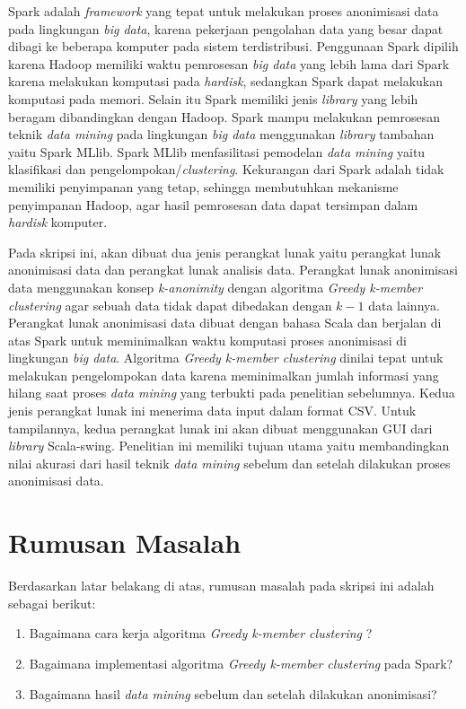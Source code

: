 Spark adalah {\it framework} yang tepat untuk melakukan proses anonimisasi data pada lingkungan \textit{big data}, karena pekerjaan pengolahan data yang besar dapat dibagi ke beberapa komputer pada sistem terdistribusi. Penggunaan Spark dipilih karena Hadoop memiliki waktu pemrosesan \textit{big data} yang lebih lama dari Spark karena melakukan komputasi pada \textit{hardisk}, sedangkan Spark dapat melakukan komputasi pada memori. Selain itu Spark memiliki jenis \textit{library} yang lebih beragam dibandingkan dengan Hadoop. Spark mampu melakukan pemrosesan teknik {\it data mining} pada lingkungan \textit{big data} menggunakan {\it library} tambahan yaitu Spark MLlib. Spark MLlib menfasilitasi pemodelan \textit{data mining} yaitu klasifikasi dan pengelompokan/\textit{clustering}. Kekurangan dari Spark adalah tidak memiliki penyimpanan yang tetap, sehingga membutuhkan  mekanisme penyimpanan Hadoop, agar hasil pemrosesan data dapat tersimpan dalam {\it hardisk} komputer.

Pada skripsi ini, akan dibuat dua jenis perangkat lunak yaitu perangkat lunak anonimisasi data dan perangkat lunak analisis data. Perangkat lunak anonimisasi data menggunakan konsep {\it k-anonimity} dengan algoritma \textit{Greedy k-member clustering} agar sebuah data tidak dapat dibedakan dengan $k-1$ data lainnya. Perangkat lunak anonimisasi data dibuat dengan bahasa Scala dan berjalan di atas Spark untuk meminimalkan waktu komputasi proses anonimisasi di lingkungan {\it big data}. Algoritma {\it Greedy k-member clustering} dinilai tepat untuk melakukan pengelompokan data karena meminimalkan jumlah informasi yang hilang saat proses {\it data mining} yang terbukti pada penelitian sebelumnya. Kedua jenis perangkat lunak ini menerima data input dalam format CSV. Untuk tampilannya, kedua perangkat lunak ini akan dibuat menggunakan GUI dari \textit{library} Scala-swing. Penelitian ini memiliki tujuan utama yaitu membandingkan nilai akurasi dari hasil teknik {\it data mining} sebelum dan setelah dilakukan proses anonimisasi data.

\section{Rumusan Masalah}
\label{sec:rumusan}
Berdasarkan latar belakang di atas, rumusan masalah pada skripsi ini adalah sebagai berikut:
\begin{enumerate}
\item Bagaimana cara kerja algoritma {\it Greedy k-member clustering} ?
\item Bagaimana implementasi algoritma {\it Greedy k-member clustering} pada Spark?
\item Bagaimana hasil {\it data mining} sebelum dan setelah dilakukan anonimisasi?
\end{enumerate}

